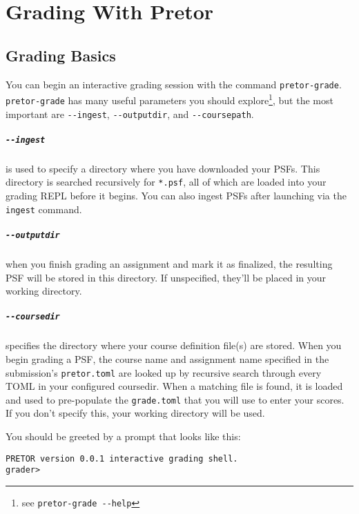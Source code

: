 \documentclass{book}
\begin{document}
\chapter{Grading With Pretor}

\section{Grading Basics} \label{sec:grading_basics}

You can begin an interactive grading session with the command
\texttt{pretor-grade}. \texttt{pretor-grade} has many useful parameters you
should explore\footnote{see \texttt{pretor-grade -{}-help}}, but the most
important are \texttt{-{}-ingest}, \texttt{-{}-outputdir}, and
\texttt{-{}-coursepath}.

\paragraph{\texttt{-{}-ingest}} is used to specify a directory where you have
downloaded your PSFs. This directory is searched recursively for
\texttt{*.psf}, all of which are loaded into your grading REPL before it
begins. You can also ingest PSFs after launching via the \texttt{ingest}
command.

\paragraph{\texttt{-{}-outputdir}} when you finish grading an assignment and mark
it as finalized, the resulting PSF will be stored in this directory. If
unspecified, they'll be placed in your working directory.

\paragraph{\texttt{-{}-coursedir}} specifies the directory where your course
definition file(s) are stored. When you begin grading a PSF, the course name
and assignment name specified in the submission's \texttt{pretor.toml} are
looked up by recursive search through every TOML in your configured coursedir.
When a matching file is found, it is loaded and used to pre-populate the
\texttt{grade.toml} that you will use to enter your scores. If you don't
specify this, your working directory will be used.

You should be greeted by a prompt that looks like this:

\begin{verbatim}
PRETOR version 0.0.1 interactive grading shell.
grader>
\end{verbatim}
\end{document}
